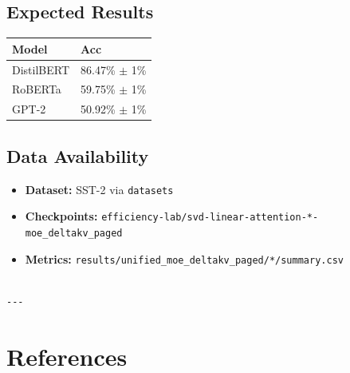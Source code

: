 \subsection{Expected Results}

\begin{table}[H]
\centering
\small
\begin{tabular}{ll}
\toprule
\textbf{Model} & \textbf{Acc} \\
\midrule
DistilBERT & 86.47\% $\pm$ 1\% \\
RoBERTa & 59.75\% $\pm$ 1\% \\
GPT-2 & 50.92\% $\pm$ 1\% \\
\bottomrule
\end{tabular}
\end{table}

\subsection{Data Availability}

\begin{itemize}
\item \textbf{Dataset:} SST-2 via \texttt{datasets}
\item \textbf{Checkpoints:} \texttt{efficiency-lab/svd-linear-attention-*-moe\_deltakv\_paged}
\item \textbf{Metrics:} \texttt{results/unified\_moe\_deltakv\_paged/*/summary.csv}
\end{itemize}
\begin{lstlisting}

---
\end{lstlisting}

\section{References}

